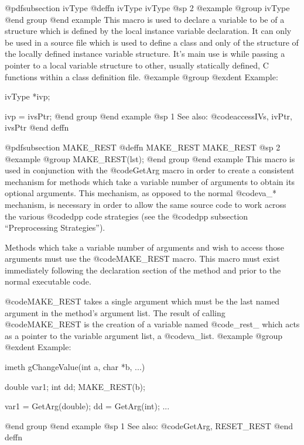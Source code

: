 {{{{@pdfsubsection {ivType}
@deffn {ivType} ivType
@sp 2
@example
@group
ivType
@end group
@end example
This macro is used to declare a variable to be of a structure which is defined
by the local instance variable declaration.  It can only be used in a source
file which is used to define a class and only of the structure of the locally
defined instance variable structure.  It's main use is while passing a pointer
to a local variable structure to other, usually statically defined, C functions
within a class definition file.
@example
@group
@exdent Example:

ivType  *ivp;

ivp = ivsPtr;
@end group
@end example
@sp 1
See also:  @code{accessIVs, ivPtr, ivsPtr}
@end deffn


















@pdfsubsection {MAKE_REST}
@deffn {MAKE_REST} MAKE_REST
@sp 2
@example
@group
MAKE_REST(lst);
@end group
@end example
This macro is used in conjunction with the @code{GetArg} macro in order
to create a consistent mechanism for methods which take a variable
number of arguments to obtain its optional arguments.  This mechanism,
as opposed to the normal @code{va_*} mechanism, is necessary in order to
allow the same source code to work across the various @code{dpp} code
strategies (see the @code{dpp} subsection ``Preprocessing Strategies'').

Methods which take a variable number of arguments and wish to access
those arguments must use the @code{MAKE_REST} macro.  This macro must
exist immediately following the declaration section of the method and
prior to the normal executable code.

@code{MAKE_REST} takes a single argument which must be the last named
argument in the method's argument list.  The result of calling
@code{MAKE_REST} is the creation of a variable named @code{_rest_}
which acts as a pointer to the variable argument list, a
@code{va_list}.
@example
@group
@exdent Example:

imeth  gChangeValue(int a, char *b, ...)
{
        double  var1;
        int     dd;
        MAKE_REST(b);

        var1 = GetArg(double);
        dd = GetArg(int);
        ...
}
@end group
@end example
@sp 1
See also:  @code{GetArg, RESET_REST}
@end deffn
















}}}}
